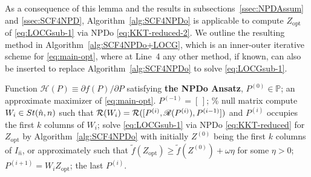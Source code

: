 \documentclass[11pt]{article}
\def\bbP{\mathbb{P}}
\def\scrH{\mathscr{H}}
\def\scrR{\mathscr{R}}
\def\cR{{\cal R}}
\def\wtd{\widetilde}
\newcommand\STM[2]{{\rm St}(#1,#2)}
\DeclareMathOperator*{\opt}{opt}
\def\scrR{\mathscr{R}}
\theoremstyle{definition}
\numberwithin{equation}{section}
\begin{document}
As a consequence of this lemma and the results in subsections~\ref{ssec:NPDAssum} and \ref{ssec:SCF4NPD}, Algorithm~\ref{alg:SCF4NPDo}
is applicable to compute $Z_{\opt}$ of \eqref{eq:LOCGsub-1} via NPDo \eqref{eq:KKT-reduced-2}.
We outline the resulting
method in Algorithm~\ref{alg:SCF4NPDo+LOCG}, which is an inner-outer iterative scheme for \eqref{eq:main-opt},
where at Line~4
any other method, if known, can also be inserted to replace Algorithm~\ref{alg:SCF4NPDo} to
solve \eqref{eq:LOCGsub-1}.

\begin{algorithm}[t]
\caption{NPDoLOCG:  NPDo \eqref{eq:KKT} solved by LOCG
  } \label{alg:SCF4NPDo+LOCG}
\begin{algorithmic}[1]\REQUIRE Function $\scrH(P)\equiv\partial f(P)/\partial P$ satisfying {\bf the NPDo Ansatz}, $P^{(0)}\in\bbP$;
\ENSURE  an approximate maximizer of \eqref{eq:main-opt}.
\STATE $P^{(-1)}=[\,]$; \% null matrix
    \STATE compute $W_i\in\STM{\hat n}{n}$ such that $\cR(W_i)=\cR([P^{(i)},\scrR(P^{(i)}),P^{(i-1)}])$
           and $P^{(i)}$ occupies
           the first $k$ columns of $W_i$;
    \STATE solve \eqref{eq:LOCGsub-1} via NPDo \eqref{eq:KKT-reduced} for $Z_{\opt}$ by  Algorithm~\ref{alg:SCF4NPDo}
           with initially $Z^{(0)}$ being the first $k$ columns of $I_{\hat n}$, or
           approximately such that
           $\wtd f(Z_{\opt})\ge\wtd f(Z^{(0)})+\omega\eta$ for some $\eta>0$;
    \STATE $P^{(i+1)}=W_iZ_{\opt}$;
\ENDFOR
\RETURN the last $P^{(i)}$.
\end{algorithmic}
\end{algorithm}
\end{document}

